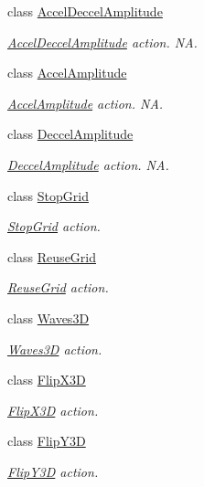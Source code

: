 \begin{DoxyCompactItemize}
class \hyperlink{classAccelDeccelAmplitude}{Accel\+Deccel\+Amplitude}
\begin{DoxyCompactList}\small\item\em \hyperlink{classAccelDeccelAmplitude}{Accel\+Deccel\+Amplitude} action.  NA. \end{DoxyCompactList}\item 
class \hyperlink{classAccelAmplitude}{Accel\+Amplitude}
\begin{DoxyCompactList}\small\item\em \hyperlink{classAccelAmplitude}{Accel\+Amplitude} action.  NA. \end{DoxyCompactList}\item 
class \hyperlink{classDeccelAmplitude}{Deccel\+Amplitude}
\begin{DoxyCompactList}\small\item\em \hyperlink{classDeccelAmplitude}{Deccel\+Amplitude} action.  NA. \end{DoxyCompactList}\item 
class \hyperlink{classStopGrid}{Stop\+Grid}
\begin{DoxyCompactList}\small\item\em \hyperlink{classStopGrid}{Stop\+Grid} action. \end{DoxyCompactList}\item 
class \hyperlink{classReuseGrid}{Reuse\+Grid}
\begin{DoxyCompactList}\small\item\em \hyperlink{classReuseGrid}{Reuse\+Grid} action. \end{DoxyCompactList}\item 
class \hyperlink{classWaves3D}{Waves3D}
\begin{DoxyCompactList}\small\item\em \hyperlink{classWaves3D}{Waves3D} action. \end{DoxyCompactList}\item 
class \hyperlink{classFlipX3D}{Flip\+X3D}
\begin{DoxyCompactList}\small\item\em \hyperlink{classFlipX3D}{Flip\+X3D} action. \end{DoxyCompactList}\item 
class \hyperlink{classFlipY3D}{Flip\+Y3D}
\begin{DoxyCompactList}\small\item\em \hyperlink{classFlipY3D}{Flip\+Y3D} action. \end{DoxyCompactList}\item 

\end{DoxyCompactItemize}

